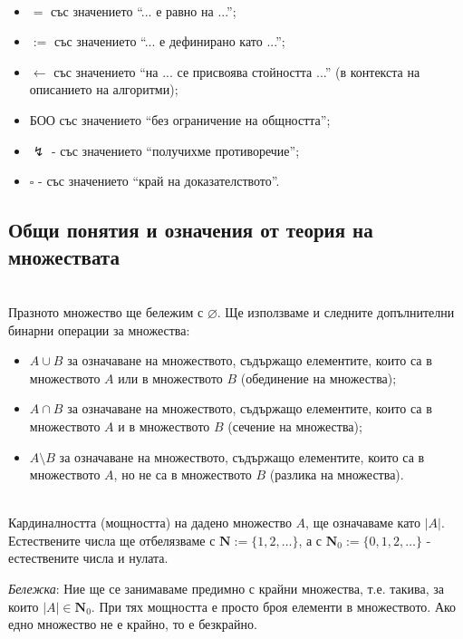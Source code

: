 \documentclass[12pt,twoside,a4paper]{article}
\begin{document}
	\begin{denotations}~
		\begin{itemize}
			\item $=$ със значението "`... е равно на ..."';
			\item $:=$ със значението "`... е дефинирано като ..."';
			\item $\gets$ със значението "`на ... се присвоява стойността ..."' (в контекста на описанието на алгоритми);
			\item БОО със значението "`без ограничение на общността"';
			\item $\lightning$ - със значението "`получихме противоречие"';
			\item $\square$ - със значението "`край на доказателството"'.
		\end{itemize}
	\end{denotations}
	
	\subsection{Общи понятия и означения от теория на множествата}
	\begin{denotations}~\\
		\indent Празното множество ще бележим с $\varnothing$. Ще използваме и следните допълнителни бинарни операции за множества:
		\begin{itemize}
			\item $A \cup B$ за означаване на множеството, съдържащо елементите, които са в множеството $A$ или в множеството $B$ (обединение на множества); 
			\item $A \cap B$ за означаване на множеството, съдържащо елементите, които са в множеството $A$ и в множеството $B$ (сечение на множества);
			\item $A \setminus B$ за означаване на множеството, съдържащо елементите, които са в множеството $A$, но не са в множеството $B$ (разлика на множества).
		\end{itemize}
	\end{denotations}
	
	\begin{denotations}~\\
		\indent Кардиналността (мощността) на дадено множество $A$, ще означаваме като $|A|$. Естествените числа ще отбелязваме с $\mathbf{N} := \{1, 2, \dots\}$, а с $\mathbf{N}_0 := \{0, 1, 2, \dots\}$ - естествените числа и нулата.
		
		\textit{Бележка}: Ние ще се занимаваме предимно с крайни множества, т.е. такива, за които $|A| \in \mathbf{N}_0$. При тях мощността е просто броя елементи в множеството. Ако едно множество не е крайно, то е безкрайно.
	\end{denotations}
	
\end{document}
